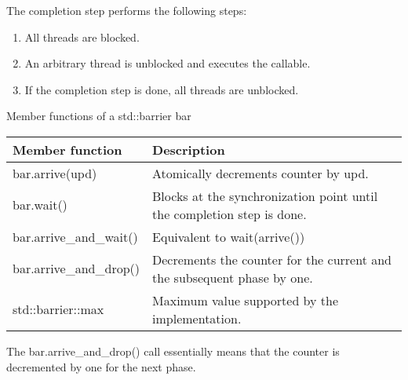 The completion step performs the following steps:

\begin{enumerate}
\item 
All threads are blocked.

\item 
An arbitrary thread is unblocked and executes the callable.

\item 
If the completion step is done, all threads are unblocked.
\end{enumerate}

\begin{center}
Member functions of a std::barrier bar
\end{center}

\begin{longtable}[c]{|l|l|}
\hline
\textbf{Member function} & \textbf{Description}                           \\ \hline
\endfirsthead
%
\endhead
%
bar.arrive(upd)          & Atomically decrements counter by upd.          \\ \hline
bar.wait()              & Blocks at the synchronization point until the completion step is done.  \\ \hline
bar.arrive\_and\_wait()  & Equivalent to wait(arrive())                   \\ \hline
bar.arrive\_and\_drop() & Decrements the counter for the current and the subsequent phase by one. \\ \hline
std::barrier::max        & Maximum value supported by the implementation. \\ \hline
\end{longtable}

The bar.arrive\_and\_drop() call essentially means that the counter is decremented by one for the next phase.


















